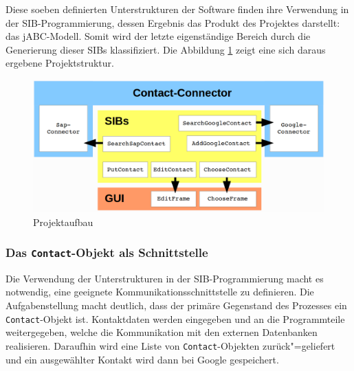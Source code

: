 Diese soeben definierten Unterstrukturen der Software finden ihre Verwendung in der SIB-Programmierung, dessen
 Ergebnis das Produkt des Projektes darstellt: das jABC-Modell.
Somit wird der letzte eigenständige Bereich durch die Generierung dieser SIBs klassifiziert.
Die Abbildung \ref{fig:projektaufbau} zeigt eine sich daraus ergebene Projektstruktur.

\begin{figure}[h!t]
\includegraphics[width=\textwidth]{Bilder/projekt_aufbau.png}
\caption{Projektaufbau}
\label{fig:projektaufbau}
\end{figure}
	
\subsubsection{Das \lstinline{Contact}-Objekt als Schnittstelle}
Die Verwendung der Unterstrukturen in der SIB-Programmierung macht es notwendig, eine geeignete
 Kommunikationsschnittstelle zu definieren.
Die Aufgabenstellung macht deutlich, dass der primäre Gegenstand des Prozesses ein \lstinline{Contact}-Objekt ist.
Kontaktdaten werden eingegeben und an die Programmteile weitergegeben, welche die Kommunikation mit den
 externen Datenbanken realisieren.
Daraufhin wird eine Liste von \lstinline{Contact}-Objekten zurück"=geliefert und ein ausgewählter Kontakt wird
 dann bei Google gespeichert.
 
